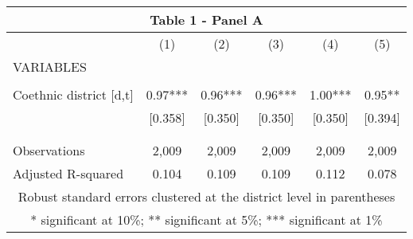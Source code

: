 \begin{tabular}{lccccc}
\multicolumn{6}{c}{Table 1 - Panel A} \\ \hline
 & (1) & (2) & (3) & (4) & (5) \\
VARIABLES &  &  &  &  &  \\ \hline
 &  &  &  &  &  \\
Coethnic district [d,t] & 0.97*** & 0.96*** & 0.96*** & 1.00*** & 0.95** \\
 & [0.358] & [0.350] & [0.350] & [0.350] & [0.394] \\
 &  &  &  &  &  \\
 &  &  &  &  &  \\
Observations & 2,009 & 2,009 & 2,009 & 2,009 & 2,009 \\
 Adjusted R-squared & 0.104 & 0.109 & 0.109 & 0.112 & 0.078 \\ \hline
\multicolumn{6}{c}{ Robust standard errors clustered at the district level in parentheses} \\
\multicolumn{6}{c}{ * significant at 10\%; ** significant at 5\%; *** significant at 1\%} \\
\end{tabular}
